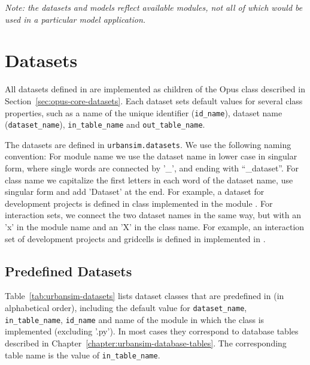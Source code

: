 \emph{Note: the datasets and models reflect available modules, not all of which would be used in a
particular model application.}

\section{Datasets}
\label{sec:urbansim-datasets}
\datasetindex
%
All datasets \datasetindex defined in  are implemented as children of the
Opus  class  \datasetindex described in
Section~\ref{sec:opus-core-datasets}. Each dataset \datasetindex sets default values for several
class properties, such as a name of the unique identifier (\verb|id_name|),
dataset \datasetindex name (\verb|dataset_name|), \datasetindex \verb|in_table_name| and
\verb|out_table_name|. 

The  datasets \datasetindex are defined in \verb|urbansim.datasets|. \datasetindex
We use the following naming convention: For module name we use the dataset 
name in lower case in singular form, where single words are connected by
'_', and ending with ``_dataset''.
For class name we capitalize the first letters in each word of the dataset \datasetindex
name, use singular form and add 'Dataset' at the end. For example, a dataset \datasetindex for
development projects is defined in class 
implemented in the module . For interaction
sets, we connect the two dataset \datasetindex names in the same way, but with 
an 'x' in the module name and an 'X' in the class name. For example, an
interaction set of development projects and gridcells is defined in
 implemented in
.

\subsection{Predefined Datasets}
\datasetindex
%
Table~\ref{tab:urbansim-datasets} lists dataset \datasetindex classes that are predefined in
 (in alphabetical order), including the default value for
\verb|dataset_name|, \datasetindex \verb|in_table_name|, \verb|id_name| and name of the
module in which the class is implemented (excluding '.py'). In most cases they
correspond to database tables described in
Chapter~\ref{chapter:urbansim-database-tables}. The corresponding table name
is the value of \verb|in_table_name|.

